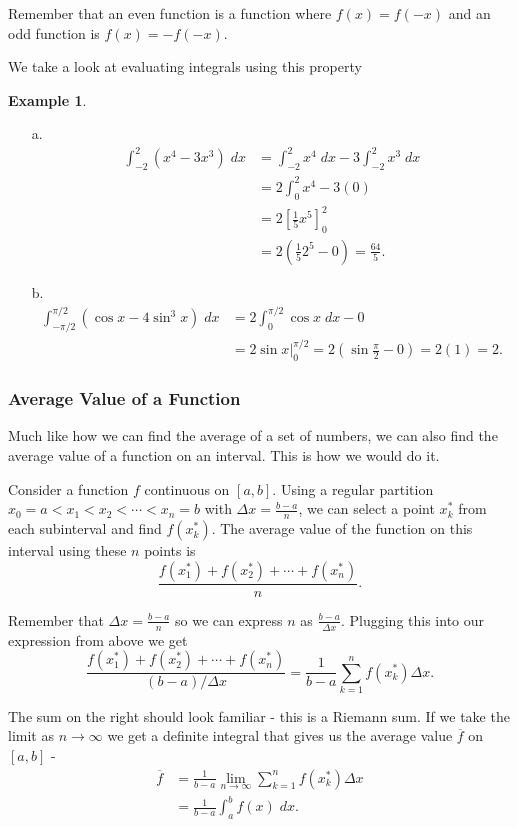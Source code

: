 \documentclass[12pt,reqno]{article}
\theoremstyle{definition}
\newtheorem*{Example}{Example}
\begin{document}
Remember that an even function is a function where $f(x) = f(-x)$ and an odd function is $f(x) = - f(-x)$. 

We take a look at evaluating integrals using this property 
\begin{Example}
	\begin{enumerate}
		\item[a.] 
		\begin{align*}
			\int_{-2}^{2} (x^4 - 3x^3) \; dx &= \int_{-2}^{2} x^4 \; dx - 3 \int_{-2}^{2} x^3 \;dx \\
			&= 2 \int_{0}^{2} x^4 - 3(0) \\
			&= 2 \left[\frac{1}{5}x^5\right]_{0}^{2} \\
			&= 2 \left(\frac{1}{5}2^5 - 0\right) = \frac{64}{5}.
		\end{align*}
	
		\item[b.] 
		\begin{align*}
			\int_{-\pi/2}^{\pi/2} (\cos x - 4 \sin^3 x) \;dx &= 2 \int_{0}^{\pi/2} \cos x \; dx - 0  \\
			&= 2 \left.\sin x \right|_{0}^{\pi/2} = 2(\sin \frac{\pi}{2} - 0) = 2(1) = 2. 
		\end{align*}
	\end{enumerate}
\end{Example}


\subsubsection{Average Value of a Function} 

Much like how we can find the average of a set of numbers, we can also find the average value of a function on an interval. This is how we would do it. 

Consider a function $f$ continuous on $[a, b]$. Using a regular partition $x_0 = a < x_1 < x_2 < \cdots < x_n = b$ with $\Delta x = \frac{b - a}{n}$, we can select a point $x_{k}^*$ from each subinterval and find $f(x_{k}^*)$. The average value of the function on this interval using these $n$ points is $$\frac{f(x_{1}^*) + f(x_{2}^*) + \cdots + f(x_{n}^*)}{n}.$$

Remember that $\Delta x = \frac{b - a}{n}$ so we can express $n$ as $\frac{b - a}{\Delta x}$. Plugging this into our expression from above we get $$\frac{f(x_{1}^*) + f(x_{2}^*) + \cdots + f(x_{n}^*)}{(b - a)/\Delta x} = \frac{1}{b - a} \sum_{k = 1}^{n} f(x_{k}^*) \Delta x.$$

The sum on the right should look familiar - this is a Riemann sum. If we take the limit as $n \to \infty $ we get a definite integral that gives us the average value $\overline{f}$ on $[a, b]$ - 
\begin{align*}
	\overline{f} &= \frac{1}{b - a} \lim_{n \to \infty} \sum_{k = 1}^{n} f(x_{k}^*) \Delta x \\ 
	&= \frac{1}{b - a} \int_{a}^{b} f(x) \; dx. 
\end{align*}
\end{document}
